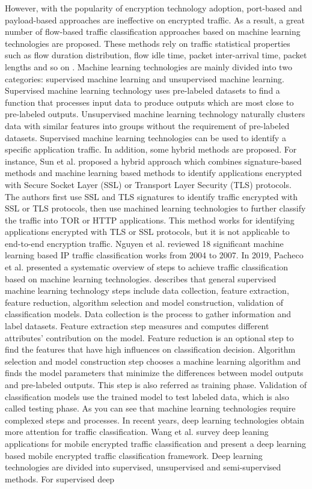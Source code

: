 \documentclass[master]{thesis}
\begin{document}
However, with the popularity of encryption technology adoption, port-based and payload-based approaches are ineffective on encrypted traffic. As a result, a great number of flow-based traffic classification approaches based on machine learning technologies are proposed. These methods rely on traffic statistical properties such as flow duration distribution, flow idle time, packet inter-arrival time, packet lengths and so on \cite{nguyen2008survey}. Machine learning technologies are mainly divided into two categories: supervised machine learning and unsupervised machine learning. Supervised machine learning technology uses pre-labeled datasets to find a function that processes input data to produce outputs which are most close to pre-labeled outputs. Unsupervised machine learning technology naturally clusters data with similar features into groups without the requirement of pre-labeled datasets. Supervised machine learning technologies can be used to identify a specific application traffic. In addition, some hybrid methods are proposed. For instance, Sun et al. \cite{sun2010novel} proposed a hybrid approach which combines signature-based methods and machine learning based methods to identify applications encrypted with Secure Socket Layer (SSL) or Transport Layer Security (TLS) protocols. The authors first use SSL and TLS signatures to identify traffic encrypted with SSL or TLS protocols, then use machined learning technologies to further classify the traffic into TOR or HTTP applications. This method works for identifying applications encrypted with TLS or SSL protocols, but it is not applicable to end-to-end encryption traffic. Nguyen et al. \cite{nguyen2008survey} reviewed 18 significant machine learning based IP traffic classification works from 2004 to 2007. In 2019, Pacheco et al. \cite{pacheco2018towards} presented a systematic overview of steps to achieve traffic classification based on machine learning technologies. \cite{pacheco2018towards} describes that general supervised machine learning technology steps include data collection, feature extraction, feature reduction, algorithm selection and model construction, validation of classification models. Data collection is the process to gather information and label datasets. Feature extraction step measures and computes different attributes’ contribution on the model. Feature reduction is an optional step to find the features that have high influences on classification decision.  Algorithm selection and model construction step chooses a machine learning algorithm and finds the model parameters that minimize the differences between model outputs and pre-labeled outputs. This step is also referred as training phase. Validation of classification models use the trained model to test labeled data, which is also called testing phase. As you can see that machine learning technologies require complexed steps and processes. In recent years, deep learning technologies obtain more attention for traffic classification. Wang et al. \cite{wang2019survey} survey deep leaning applications for mobile encrypted traffic classification and present a deep learning based mobile encrypted traffic classification framework. Deep learning technologies are divided into supervised, unsupervised and semi-supervised methods. For supervised deep 
\end{document}
